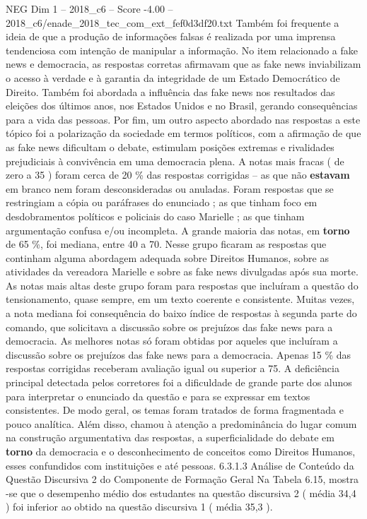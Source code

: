 \begin{textsample}{NEG Dim 1 – 2018\_c6 – Score -4.00 – 2018\_c6/enade\_2018\_tec\_com\_ext\_fef0d3df20.txt}
Também foi frequente a ideia de que a produção de informações falsas é realizada por uma imprensa tendenciosa com intenção de manipular a informação.
No item relacionado a fake news e democracia, as respostas corretas afirmavam que as fake news inviabilizam o acesso à verdade e à garantia da integridade de um Estado Democrático de Direito.
Também foi abordada a influência das fake news nos resultados das eleições dos últimos anos, nos Estados Unidos e no Brasil, gerando consequências para a vida das pessoas.
Por fim, um outro aspecto abordado nas respostas a este tópico foi a polarização da sociedade em termos políticos, com a afirmação de que as fake news dificultam o debate, estimulam posições extremas e rivalidades prejudiciais à convivência em uma democracia plena.
A notas mais fracas ( de zero a 35 ) foram cerca de 20 \% das respostas corrigidas – as que não \textbf{estavam} em branco nem foram desconsideradas ou anuladas.
Foram respostas que se restringiam a cópia ou paráfrases do enunciado ; as que tinham foco em desdobramentos políticos e policiais do caso Marielle ; as que tinham argumentação confusa e/ou incompleta.
A grande maioria das notas, em \textbf{torno} de 65 \%, foi mediana, entre 40 a 70.
Nesse grupo ficaram as respostas que continham alguma abordagem adequada sobre Direitos Humanos, sobre as atividades da vereadora Marielle e sobre as fake news divulgadas após sua morte.
As notas mais altas deste grupo foram para respostas que incluíram a questão do tensionamento, quase sempre, em um texto coerente e consistente.
Muitas vezes, a nota mediana foi consequência do baixo índice de respostas à segunda parte do comando, que solicitava a discussão sobre os prejuízos das fake news para a democracia.
As melhores notas só foram obtidas por aqueles que incluíram a discussão sobre os prejuízos das fake news para a democracia.
Apenas 15 \% das respostas corrigidas receberam avaliação igual ou superior a 75.
A deficiência principal detectada pelos corretores foi a dificuldade de grande parte dos alunos para interpretar o enunciado da questão e para se expressar em textos consistentes.
De modo geral, os temas foram tratados de forma fragmentada e pouco analítica.
Além disso, chamou à atenção a predominância do lugar comum na construção argumentativa das respostas, a superficialidade do debate em \textbf{torno} da democracia e o desconhecimento de conceitos como Direitos Humanos, esses confundidos com instituições e até pessoas. 6.3.1.3 Análise de Conteúdo da Questão Discursiva 2 do Componente de Formação Geral Na Tabela 6.15, mostra -se que o desempenho médio dos estudantes na questão discursiva 2 ( média 34,4 ) foi inferior ao obtido na questão discursiva 1 ( média 35,3 ).

\end{textsample}
